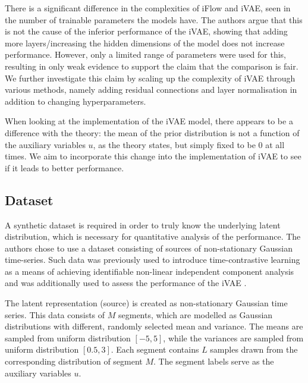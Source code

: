 There is a significant difference in the complexities of iFlow and iVAE, seen in the number of trainable parameters the models have. The authors argue that this is not the cause of the inferior performance of the iVAE, showing that adding more layers/increasing the hidden dimensions of the model does not increase performance. However, only a limited range of parameters were used for this, resulting in only weak evidence to support the claim that the comparison is fair. 
We further investigate this claim by scaling up the complexity of iVAE through various methods, namely adding residual connections and layer normalisation in addition to changing hyperparameters.

When looking at the implementation of the iVAE model, there appears to be a difference with the theory: the mean of the prior distribution is not a function of the auxiliary variables $u$, as the theory states, but simply fixed to be 0 at all times. We aim to incorporate this change into the implementation of iVAE to see if it leads to better performance.

\subsection{Dataset}
A synthetic dataset is required in order to truly know the underlying latent distribution, which is necessary for quantitative analysis of the performance.
The authors chose to use a dataset consisting of sources of non-stationary Gaussian time-series. Such data was previously used to introduce time-contrastive learning as a means of achieving identifiable non-linear independent component analysis \cite{hyvarinen2016unsupervised} and was additionally used to assess the performance of the iVAE \cite{khemakhem2020variational}. 

The latent representation (source) is created as non-stationary Gaussian time series. This data consists of $M$ segments, which are modelled as Gaussian distributions with different, randomly selected mean and variance. The means are sampled from uniform distribution $[-5,5]$, while the variances are sampled from uniform distribution $[0.5,3]$. 
Each segment contains $L$ samples drawn from the corresponding distribution of segment $M$. The segment labels serve as the auxiliary variables $u$.

